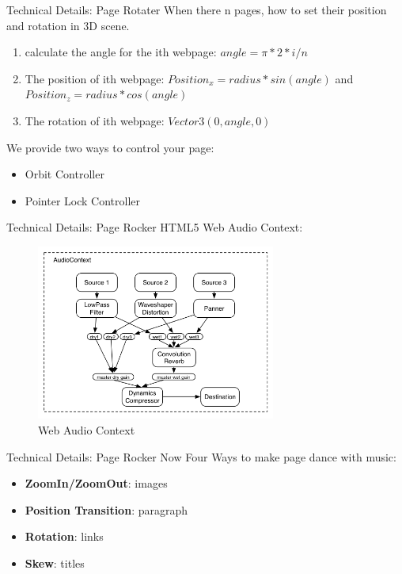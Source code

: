 \documentclass{beamer}
\begin{document}
\begin{frame}{Technical Details: Page Rotater}
When there n pages, how to set their position and rotation in 3D scene.
\begin{enumerate}
    \item calculate the angle for the ith webpage: $angle = \pi * 2 * i / n$
    \item The position of ith webpage: $Position_{x} = radius * sin(angle)$ and $Position_{z} = radius * cos(angle)$
    \item The rotation of ith webpage: $Vector3(0, angle, 0)$
\end{enumerate}
We provide two ways to control your page:
\begin{itemize}
    \item Orbit Controller
    \item Pointer Lock Controller
\end{itemize}
\end{frame}

\begin{frame}{Technical Details: Page Rocker}
HTML5 Web Audio Context:
\begin{center}
    \begin{figure}
        \includegraphics[width=0.7\textwidth]{./images/audiocontext.png}
        \caption{Web Audio Context}
    \end{figure}
\end{center}
\end{frame}

\begin{frame}{Technical Details: Page Rocker}
Now Four Ways to make page dance with music:
\begin{itemize}
    \item \textbf{ZoomIn/ZoomOut}: images
    \item \textbf{Position Transition}: paragraph
    \item \textbf{Rotation}: links
    \item \textbf{Skew}: titles
\end{itemize}
\end{frame}
\end{document}
